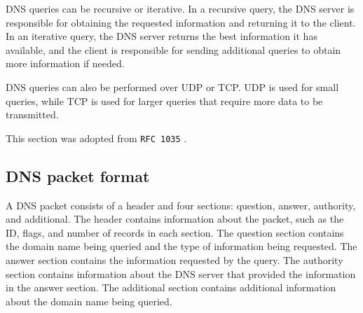 \documentclass[a4paper, 11pt]{article}
\begin{document}
        DNS queries can be recursive or iterative.
        In a recursive query, the DNS server is responsible for obtaining the requested information and returning it to the client.
        In an iterative query, the DNS server returns the best information it has available, 
        and the client is responsible for sending additional queries to obtain more information if needed.

        DNS queries can also be performed over UDP or TCP.
        UDP is used for small queries, while TCP is used for larger queries that require more data to be transmitted.

        This section was adopted from \texttt{RFC 1035} \cite{1987}.

    \subsection{DNS packet format}


        A DNS packet consists of a header and four sections: question, answer, authority, and additional.
        The header contains information about the packet, such as the ID, flags, and number of records in each section.
        The question section contains the domain name being queried and the type of information being requested.
        The answer section contains the information requested by the query.
        The authority section contains information about the DNS server that provided the information in the answer section.
        The additional section contains additional information about the domain name being queried.
\end{document}
